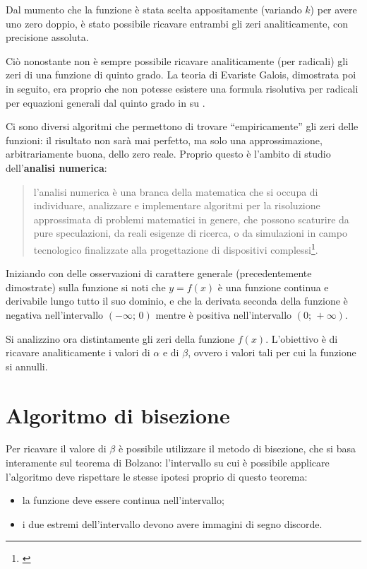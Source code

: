 \documentclass[a4paper, oneside, titlepage, reqno]{book}
\newcommand{\citazione}[2]{\footnote{\cite{#1} \fullcite[#2]{#1}}} %
\begin{document}
Dal mumento che la funzione è stata scelta appositamente (variando $k$) per avere uno zero doppio, è stato possibile ricavare entrambi gli zeri analiticamente, con precisione assoluta. 

Ciò nonostante non è sempre possibile ricavare analiticamente (per radicali) gli zeri di una funzione di quinto grado.
La teoria di Evariste Galois, dimostrata poi in seguito, era proprio che non potesse esistere una formula risolutiva per radicali per equazioni generali dal quinto grado in su \parencite[12]{eq:ter}.

Ci sono diversi algoritmi che permettono di trovare ``empiricamente'' gli zeri delle funzioni: il risultato non sarà mai perfetto, ma solo una approssimazione, arbitrariamente buona, dello zero reale.
Proprio questo è l'ambito di studio dell'\textbf{analisi numerica}: 
\begin{quotation}
\noindent l'analisi numerica è una branca della matematica che si occupa di individuare, analizzare e implementare algoritmi per la risoluzione approssimata di problemi matematici in genere, che possono scaturire da pure speculazioni, da reali esigenze di ricerca, o da simulazioni in campo tecnologico finalizzate alla progettazione di dispositivi complessi\citazione{trec:an}{}.
\end{quotation}

Iniziando con delle osservazioni di carattere generale (precedentemente dimostrate) sulla funzione si noti che $y=f(x)$ è una funzione continua e derivabile lungo tutto il suo dominio, e che la derivata seconda della funzione è negativa nell'intervallo $(-\infty;\,0)$ mentre è positiva nell'intervallo $(0;\,+\infty)$.

Si analizzino ora distintamente gli zeri della funzione $f(x)$. L'obiettivo è di ricavare analiticamente i valori di $\alpha$ e di $\beta$, ovvero i valori tali per cui la funzione si annulli.

\section{Algoritmo di bisezione}

Per ricavare il valore di $\beta$ è possibile utilizzare il metodo di bisezione, che si basa interamente sul teorema di Bolzano: l'intervallo su cui è possibile applicare l'algoritmo deve rispettare le stesse ipotesi proprio di questo teorema:
\begin{itemize}
\item la funzione deve essere continua nell'intervallo;
\item i due estremi dell'intervallo devono avere immagini di segno discorde.
\end{itemize}
\end{document}
